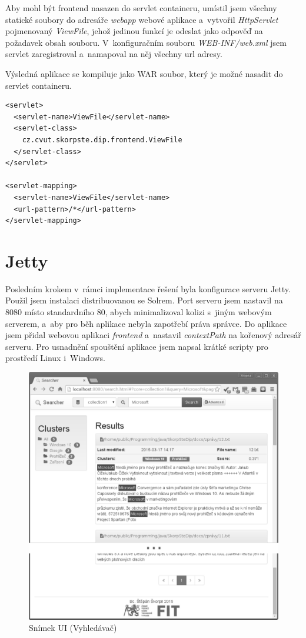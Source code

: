 Aby mohl být frontend nasazen do servlet containeru, umístil jsem všechny statické soubory do adresáře \emph{webapp} webové aplikace a~vytvořil \emph{HttpServlet} pojmenovaný \emph{ViewFile}, jehož jedinou funkcí je odeslat jako odpověď na požadavek obsah souboru. V~konfiguračním souboru \emph{WEB-INF/web.xml} jsem servlet zaregistroval a~namapoval na něj všechny url adresy. 

Výsledná aplikace se kompiluje jako WAR soubor, který je možné nasadit do servlet containeru.

\begin{verbatim}
<servlet>
  <servlet-name>ViewFile</servlet-name>
  <servlet-class>
    cz.cvut.skorpste.dip.frontend.ViewFile
  </servlet-class>
</servlet>

<servlet-mapping>
  <servlet-name>ViewFile</servlet-name>
  <url-pattern>/*</url-pattern>
</servlet-mapping>
\end{verbatim}

\section{Jetty}
Posledním krokem v~rámci implementace řešení byla konfigurace serveru Jetty. Použil jsem instalaci distribuovanou se Solrem. Port serveru jsem nastavil na 8080 místo standardního 80, abych minimalizoval kolizi s~jiným webovým serverem, a~aby pro běh aplikace nebyla zapotřebí práva správce. Do aplikace jsem přidal webovou aplikaci \emph{frontend} a~nastavil \emph{contextPath} na kořenový adresář serveru. Pro usnadnění spouštění aplikace jsem napsal krátké scripty pro prostředí Linux i~Windows.

\begin{figure}[h]
\begin{center}
\includegraphics[width=13cm]{ScreenSearcher}
\caption{Snímek UI (Vyhledávač)}
\label{fig:ScreenSearcher}
\end{center}
\end{figure}

